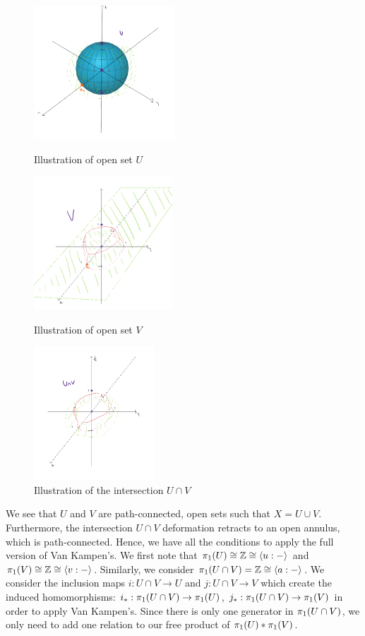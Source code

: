 \documentclass{article}
\begin{document}
\begin{flushleft}
        \begin{figure}[!h]
            \includegraphics[height=5cm, width=\linewidth]{images/q2-u-openset.png}
            \caption*{Illustration of open set $U$}
        \endminipage\hfill
            \includegraphics[height=5cm, width=\linewidth]{images/q2-v-openset.png}
            \caption*{Illustration of open set $V$}
        \endminipage\hfill
            \includegraphics[height=5cm, width=\linewidth]{images/q2-intersect-openset.png}
            \caption*{Illustration of the intersection $U \cap V$}
        \endminipage
    \end{figure}

    We see that $U$ and $V$ are path-connected, open sets such that $X = U \cup V$. Furthermore, the intersection $U \cap V$ deformation retracts to an open annulus, which is path-connected. Hence, we have all the conditions to apply the full version of Van Kampen's. We first note that $\pi_1(U) \cong \mathbb{Z} \cong \langle u : - \rangle$ and $\pi_1(V) \cong \mathbb{Z} \cong \langle v : - \rangle$. Similarly, we consider $\pi_1(U \cap V) = \mathbb{Z} \cong \langle a : - \rangle$. We consider the inclusion maps $i : U \cap V \rightarrow U$ and $j : U \cap V \rightarrow V$ which create the induced homomorphisms: $i_\ast : \pi_1(U \cap V) \rightarrow \pi_1(U)$, $j_\ast : \pi_1(U \cap V) \rightarrow \pi_1(V)$ in order to apply Van Kampen's. Since there is only one generator in $\pi_1(U \cap V)$, we only need to add one relation to our free product of $\pi_1(U) \ast \pi_1(V)$. \newline 


\end{flushleft}
\end{document}
